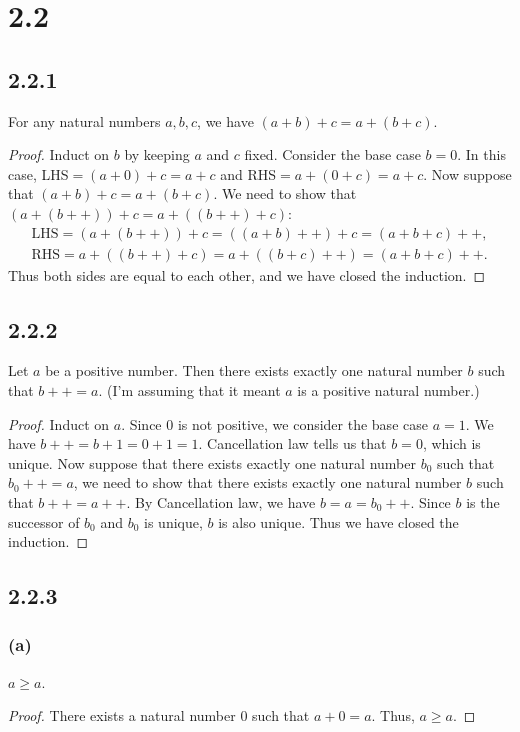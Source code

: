 \documentclass[12pt, letter]{article}
\begin{document}
\section*{2.2}
\subsection*{2.2.1}
For any natural numbers $a, b, c$, we have $(a+b)+c=a+(b+c)$.
\begin{proof}
    Induct on $b$ by keeping $a$ and $c$ fixed. Consider the base case $b=0$. In this case, LHS$=(a+0)+c=a+c$ and RHS$=a+(0+c)=a+c$. Now suppose that 
    $(a+b)+c=a+(b+c)$. We need to show that $(a+(b++))+c=a+((b++)+c)$: 
    \begin{equation*}
        \begin{aligned}
            \text{LHS}=(a+(b++))+c=((a+b)++)+c=(a+b+c)++,\\
            \text{RHS}=a+((b++)+c)=a+((b+c)++)=(a+b+c)++.
        \end{aligned}
    \end{equation*}
    Thus both sides are equal to each other, and we have closed the induction.
\end{proof}

\subsection*{2.2.2}
Let $a$ be a positive number. Then there exists exactly one natural number $b$ such that $b++=a$. (I'm assuming that it meant $a$ is a positive natural number.)
\begin{proof}
    Induct on $a$. Since $0$ is not positive, we consider the base case $a=1$. We have $b++=b+1=0+1=1$. Cancellation law tells us that $b=0$, which is unique. Now suppose that there exists exactly one natural number $b_0$ such that $b_0++=a$, we need to show that
    there exists exactly one natural number $b$ such that $b++=a++$. By Cancellation law, we have $b=a=b_0++$. Since $b$ is the successor of $b_0$ and $b_0$ is unique, $b$ is also unique. Thus we have closed the induction.
\end{proof}

\subsection*{2.2.3}
\subsubsection*{(a)}
$a\geq a$.
\begin{proof}
    There exists a natural number $0$ such that $a+0=a$. Thus, $a\geq a$.
\end{proof}
\end{document}
